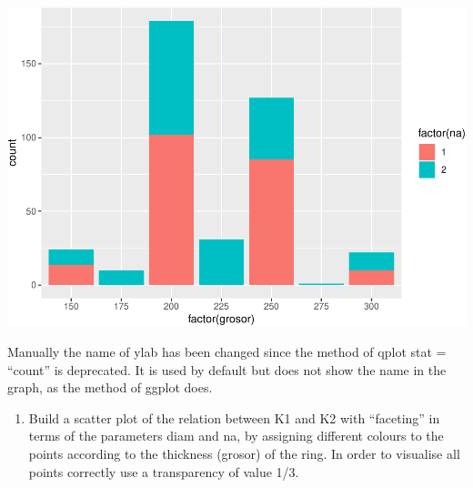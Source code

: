 \documentclass[]{article}
\newenvironment{Shaded}{\begin{snugshade}}{\end{snugshade}}
\newcommand{\DataTypeTok}[1]{\textcolor[rgb]{0.13,0.29,0.53}{#1}}
\newcommand{\DecValTok}[1]{\textcolor[rgb]{0.00,0.00,0.81}{#1}}
\newcommand{\KeywordTok}[1]{\textcolor[rgb]{0.13,0.29,0.53}{\textbf{#1}}}
\newcommand{\NormalTok}[1]{#1}
\newcommand{\OperatorTok}[1]{\textcolor[rgb]{0.81,0.36,0.00}{\textbf{#1}}}
\newcommand{\OtherTok}[1]{\textcolor[rgb]{0.56,0.35,0.01}{#1}}
\newcommand{\StringTok}[1]{\textcolor[rgb]{0.31,0.60,0.02}{#1}}
\providecommand{\tightlist}{%
  \setlength{\itemsep}{0pt}\setlength{\parskip}{0pt}}
\begin{document}
\begin{Shaded}
\end{Shaded}

\includegraphics{document_files/figure-latex/unnamed-chunk-6-1.pdf}

Manually the name of ylab has been changed since the method of qplot
stat = ``count'' is deprecated. It is used by default but does not show
the name in the graph, as the method of ggplot does.

\begin{enumerate}
\def\labelenumi{\arabic{enumi}.}
\setcounter{enumi}{4}
\tightlist
\item
  Build a scatter plot of the relation between K1 and K2 with
  ``faceting'' in terms of the parameters diam and na, by assigning
  different colours to the points according to the thickness (grosor) of
  the ring. In order to visualise all points correctly use a
  transparency of value 1/3.
\end{enumerate}
\end{document}
